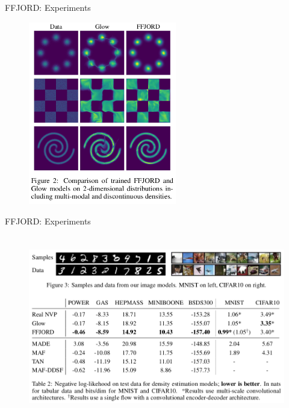 \begin{frame}{FFJORD: Experiments}
\begin{figure}
    \centering
    \includegraphics[width=\textwidth,height=8cm, keepaspectratio]{Images/ffjord_experiments1.png}
    \label{fig:ffjord_experiments1}
\end{figure}
\end{frame}
\begin{frame}{FFJORD: Experiments}
\begin{figure}
    \centering
    \includegraphics[width=\textwidth,height=8cm, keepaspectratio]{Images/ffjord_experiments2.png}
    \label{fig:ffjord_experiments2}
\end{figure}
\end{frame}
